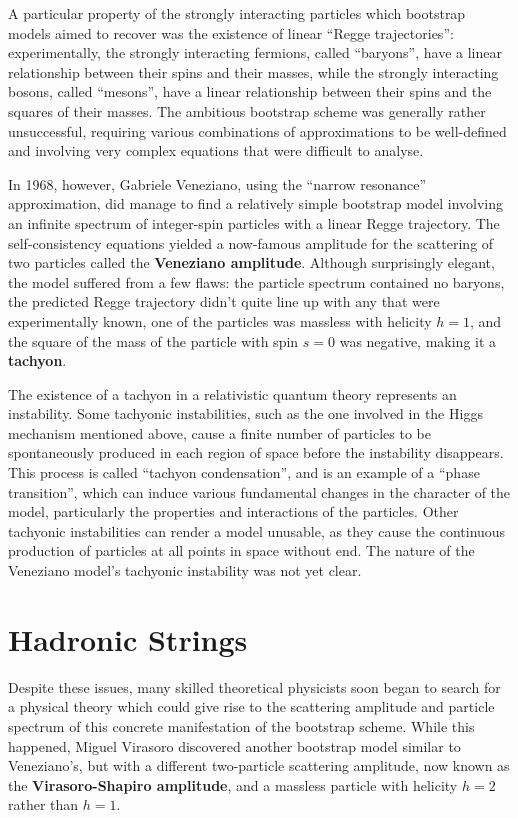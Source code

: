 \documentclass[12pt]{article}
\begin{document}
A particular property of the strongly interacting particles which bootstrap models aimed to recover was the existence of linear ``Regge trajectories'': experimentally, the strongly interacting fermions, called ``baryons'', have a linear relationship between their spins and their masses, while the strongly interacting bosons, called ``mesons'', have a linear relationship between their spins and the squares of their masses. The ambitious bootstrap scheme was generally rather unsuccessful, requiring various combinations of approximations to be well-defined and involving very complex equations that were difficult to analyse.
\newline

In 1968, however, Gabriele Veneziano, using the ``narrow resonance'' approximation, did manage to find a relatively simple bootstrap model involving an infinite spectrum of integer-spin particles with a linear Regge trajectory. The self-consistency equations yielded a now-famous amplitude for the scattering of two particles called the \textbf{Veneziano amplitude}. Although surprisingly elegant, the model suffered from a few flaws: the particle spectrum contained no baryons, the predicted Regge trajectory didn't quite line up with any that were experimentally known, one of the particles was massless with helicity $h=1$, and the square of the mass of the particle with spin $s=0$ was negative, making it a \textbf{tachyon}.
\newline

The existence of a tachyon in a relativistic quantum theory represents an instability. Some tachyonic instabilities, such as the one involved in the Higgs mechanism mentioned above, cause a finite number of particles to be spontaneously produced in each region of space before the instability disappears. This process is called ``tachyon condensation'', and is an example of a ``phase transition'', which can induce various fundamental changes in the character of the model, particularly the properties and interactions of the particles. Other tachyonic instabilities can render a model unusable, as they cause the continuous production of particles at all points in space without end. The nature of the Veneziano model's tachyonic instability was not yet clear.

\section{Hadronic Strings}

Despite these issues, many skilled theoretical physicists soon began to search for a physical theory which could give rise to the scattering amplitude and particle spectrum of this concrete manifestation of the bootstrap scheme. While this happened, Miguel Virasoro discovered another bootstrap model similar to Veneziano's, but with a different two-particle scattering amplitude, now known as the \textbf{Virasoro-Shapiro amplitude}, and a massless particle with helicity $h=2$ rather than $h=1$.
\newline
\end{document}
